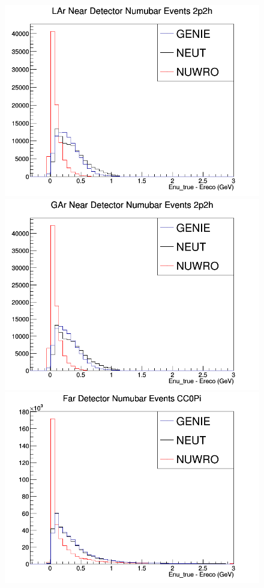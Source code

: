 \begin{figure}[h]
\endminipage
{}
\includegraphics[width=\linewidth]{Ereco_Etrue/numubar_LAr_2p2h.png}
\endminipage
{}
\includegraphics[width=\linewidth]{Ereco_Etrue/numubar_GAr_2p2h.png}
\endminipage
\newline
{}
\includegraphics[width=\linewidth]{Ereco_Etrue/numubar_FD_CC0Pi.png}

\end{figure}
